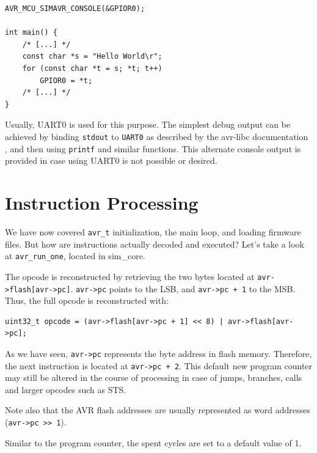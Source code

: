 \begin{lstlisting}
AVR_MCU_SIMAVR_CONSOLE(&GPIOR0);

int main() {
    /* [...] */
    const char *s = "Hello World\r";
    for (const char *t = s; *t; t++)
        GPIOR0 = *t;
    /* [...] */
}
\end{lstlisting}

Usually, UART0 is used for this purpose. The simplest debug output can be achieved
by binding \lstinline|stdout| to \lstinline|UART0| as described by the avr-libc
documentation \cite{libc}, and then using \lstinline|printf| and similar functions.
This alternate console output is provided in case using UART0 is not possible or desired.



\section{Instruction Processing} \label{section:instruction_processing}

We have now covered \lstinline|avr_t| initialization, the main loop, and loading
firmware files. But how are instructions actually decoded and executed? Let's
take a look at \lstinline|avr_run_one|, located in sim\_core.

The opcode is reconstructed by retrieving the two bytes located at
\lstinline|avr->flash[avr->pc]|. \lstinline|avr->pc| points to the \ac{LSB}, and
\lstinline|avr->pc + 1| to the \ac{MSB}. Thus, the full opcode is reconstructed with:

\begin{lstlisting}
uint32_t opcode = (avr->flash[avr->pc + 1] << 8) | avr->flash[avr->pc];
\end{lstlisting}

As we have seen, \lstinline|avr->pc| represents the byte address in flash memory.
Therefore, the next instruction is located at \lstinline|avr->pc + 2|. This
default new program counter may still be altered in the course of processing
in case of jumps, branches, calls and larger opcodes such as STS\cite{instructionset}.

Note also that the \ac{AVR} flash addresses are usually represented as word addresses
(\lstinline|avr->pc >> 1|).

Similar to the program counter, the spent cycles are set to a default value of 1.

